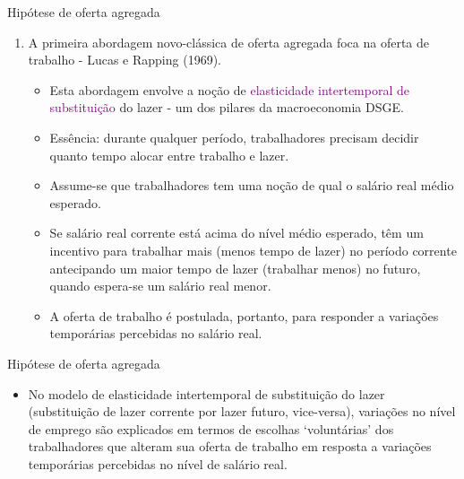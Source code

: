 \documentclass[10pt]{beamer}
\begin{document}
\begin{frame}{Hipótese de oferta agregada}
    \begin{enumerate}
        \item A primeira abordagem novo-clássica de oferta agregada foca na oferta de trabalho - Lucas e Rapping (1969).
        \bigskip
        \begin{itemize}
            \item Esta abordagem envolve a noção de \textcolor{purple}{elasticidade intertemporal de substituição} do lazer - um dos pilares da macroeconomia DSGE.
            \bigskip
            \item Essência: durante qualquer período, trabalhadores precisam decidir quanto tempo alocar entre trabalho e lazer.
            \bigskip
            \item Assume-se que trabalhadores tem uma noção de qual o salário real médio esperado.
            \bigskip
            \item Se salário real corrente está acima do nível médio esperado, têm um incentivo para trabalhar mais (menos tempo de lazer) no período corrente antecipando um maior tempo de lazer (trabalhar menos) no futuro, quando espera-se um salário real menor.
            \bigskip
            \item A oferta de trabalho é postulada, portanto, para responder a variações temporárias percebidas no salário real.
        \end{itemize}
    \end{enumerate}
\end{frame}

\begin{frame}{Hipótese de oferta agregada}
    \begin{itemize}
        \item No modelo de elasticidade intertemporal de substituição do lazer (substituição de lazer corrente por lazer futuro, vice-versa), variações no nível de emprego são explicados em termos de escolhas `voluntárias' dos trabalhadores que alteram sua oferta de trabalho em resposta a variações temporárias percebidas no nível de salário real.
    \end{itemize}
\end{frame}
\end{document}
